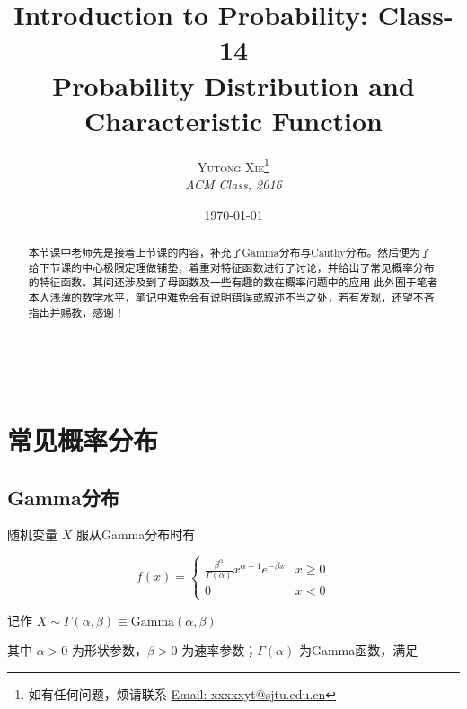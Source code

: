 \documentclass[a4paper, 11pt]{article} %
\title{\textbf{Introduction to Probability: Class-14}\\ %
Probability Distribution and Characteristic Function} %
\author{\textsc{Yutong Xie\footnote{如有任何问题，烦请联系 \href{mailto:xxxxxyt@sjtu.edu.cn}{Email: xxxxxyt@sjtu.edu.cn}}} %
\\{\textit{ACM Class, 2016}}} %
\date{\today} %
\makeatletter
\renewcommand{\maketitle}{ %

\begin{flushright} %
{\LARGE\@title} %

\vspace{50pt} %

{\large\@author} %
\\\@date %

\vspace{10pt} %
\end{flushright}
}
\makeatother
\begin{document}
\maketitle %



\begin{abstract}
本节课中老师先是接着上节课的内容，补充了Gamma分布与Cauthy分布。然后便为了给下节课的中心极限定理做铺垫，着重对特征函数进行了讨论，并给出了常见概率分布的特征函数。其间还涉及到了母函数及一些有趣的数在概率问题中的应用
此外囿于笔者本人浅薄的数学水平，笔记中难免会有说明错误或叙述不当之处，若有发现，还望不吝指出并赐教，感谢！
\end{abstract}
\vspace{10pt} %

\newpage

\tableofcontents
\newpage
\section{常见概率分布}\subsection{Gamma分布}

随机变量 $X$ 服从Gamma分布时有

\begin{equation*}
f(x)=
\begin{cases}
\frac{\beta^\alpha}{\Gamma(\alpha)}x^{\alpha-1}e^{-\beta x} & x\ge 0 \\
0& x < 0
\end{cases}
\end{equation*}

记作 $X\sim \Gamma(\alpha,\beta)\equiv \text{Gamma}(\alpha,\beta)$

其中 $\alpha>0$ 为形状参数，$\beta>0$ 为速率参数；$\Gamma(\alpha)$ 为Gamma函数，满足
\end{document}
